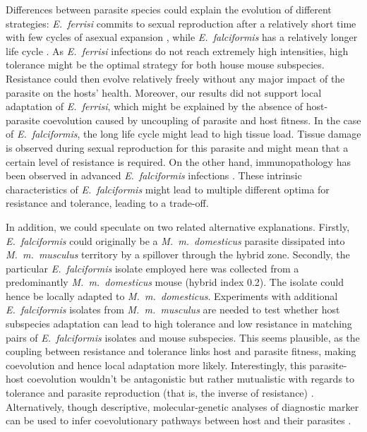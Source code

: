 Differences between parasite species could explain the evolution of different strategies: \textit{E.~ferrisi} commits to sexual reproduction after a relatively short time with few cycles of asexual expansion \citep{al-khlifeh_eimeria_2019, ankrom_life_1975}, while \textit{E.~falciformis} has a relatively longer life cycle \citep{al-khlifeh_eimeria_2019, haberkorn_entwicklung_1970}. As \textit{E.~ferrisi }infections do not reach extremely high intensities, high tolerance might be the optimal strategy for both house mouse subspecies. Resistance could then evolve relatively freely without any major impact of the parasite on the hosts’ health. Moreover, our results did not support local adaptation of \textit{E.~ferrisi}, which might be explained by the absence of host-parasite coevolution caused by uncoupling of parasite and host fitness. In the case of \textit{E.~falciformis}, the long life cycle might lead to high tissue load. Tissue damage is observed during sexual reproduction for this parasite \citep{ehret_dual_2017} and might mean that a certain level of resistance is required. On the other hand, immunopathology has been observed in advanced \textit{E.~falciformis} infections \citep{stange_il-22_2012}. These intrinsic characteristics of \textit{E.~falciformis} might lead to multiple different optima for resistance and tolerance, leading to a trade-off.\par

In addition, we could speculate on two related alternative explanations. Firstly, \textit{E.~falciformis} could originally be a \textit{M.~m.~domesticus} parasite dissipated into \textit{M.~m.~musculus} territory by a spillover through the hybrid zone. Secondly, the particular \textit{E.~falciformis} isolate employed here was collected from a predominantly \textit{M.~m.~domesticus} mouse (hybrid index 0.2). The isolate could hence be locally adapted to \textit{M.~m.~domesticus}. Experiments with additional \textit{E.~falciformis} isolates from \textit{M.~m.~musculus} are needed to test whether host subspecies adaptation can lead to high tolerance and low resistance in matching pairs of \textit{E.~falciformis} isolates and mouse subspecies. This seems plausible, as the coupling between resistance and tolerance links host and parasite fitness, making coevolution and hence local adaptation more likely. Interestingly, this parasite-host coevolution wouldn’t be antagonistic but rather mutualistic with regards to tolerance and parasite reproduction (that is, the inverse of resistance) \citep{little_coevolution_2010, raaberg_decomposing_2009}. Alternatively, though descriptive, molecular-genetic analyses of diagnostic marker can be used to infer coevolutionary pathways between host and their parasites \parencite[e.g. ][]{kvac_coevolution_2013,gouy_de_bellocq_holobiont_2018}.
\par

